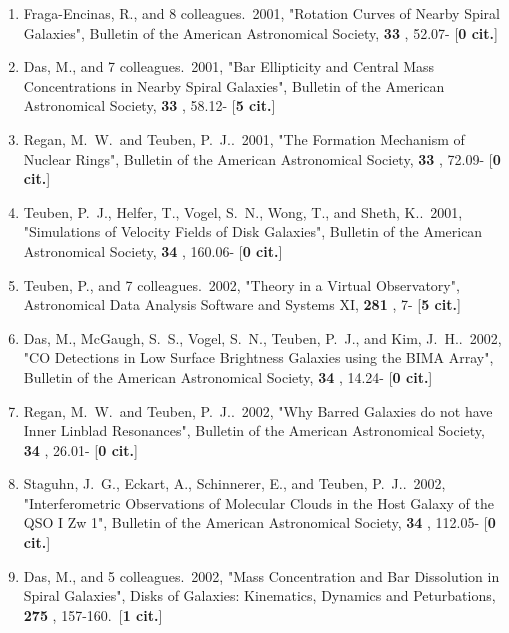 \documentclass[11pt,letterpaper]{article}
\begin{document}
\begin{enumerate}[resume,label=\textbf{\arabic*}.]
\item  
Fraga-Encinas, R., and 8 colleagues.\  2001,  "Rotation Curves of Nearby 
Spiral Galaxies", Bulletin of the American Astronomical Society,  {\bf 33} 
, 52.07- [{\bf 0 cit.}] 

\item  
Das, M., and 7 colleagues.\  2001,  "Bar Ellipticity and Central Mass 
Concentrations in Nearby Spiral Galaxies", Bulletin of the American 
Astronomical Society,  {\bf 33} , 58.12- [{\bf 5 cit.}] 

\item  
Regan, M.~W.~and Teuben, P.~J..\  2001,  "The Formation Mechanism of 
Nuclear Rings", Bulletin of the American Astronomical Society,  {\bf 33} , 
72.09- [{\bf 0 cit.}] 

\item  
Teuben, P.~J., Helfer, T., Vogel, S.~N., Wong, T., and Sheth, K..\  2001,  
"Simulations of Velocity Fields of Disk Galaxies", Bulletin of the American 
Astronomical Society,  {\bf 34} , 160.06- [{\bf 0 cit.}] 

\item  
Teuben, P., and 7 colleagues.\  2002,  "Theory in a Virtual Observatory", 
Astronomical Data Analysis Software and Systems XI,  {\bf 281} , 7- [{\bf 5 
cit.}] 

\item  
Das, M., McGaugh, S.~S., Vogel, S.~N., Teuben, P.~J., and Kim, J.~H..\  
2002,  "CO Detections in Low Surface Brightness Galaxies using the BIMA 
Array", Bulletin of the American Astronomical Society,  {\bf 34} , 14.24- 
[{\bf 0 cit.}] 

\item  
Regan, M.~W.~and Teuben, P.~J..\  2002,  "Why Barred Galaxies do not have 
Inner Linblad Resonances", Bulletin of the American Astronomical Society,  
{\bf 34} , 26.01- [{\bf 0 cit.}] 

\item  
Staguhn, J.~G., Eckart, A., Schinnerer, E., and Teuben, P.~J..\  2002,  
"Interferometric Observations of Molecular Clouds in the Host Galaxy of the 
QSO I Zw 1", Bulletin of the American Astronomical Society,  {\bf 34} , 
112.05- [{\bf 0 cit.}] 

\item  
Das, M., and 5 colleagues.\  2002,  "Mass Concentration and Bar Dissolution 
in Spiral Galaxies", Disks of Galaxies: Kinematics, Dynamics and 
Peturbations,  {\bf 275} , 157-160.\  [{\bf 1 cit.}] 


\end{enumerate}
\end{document}
